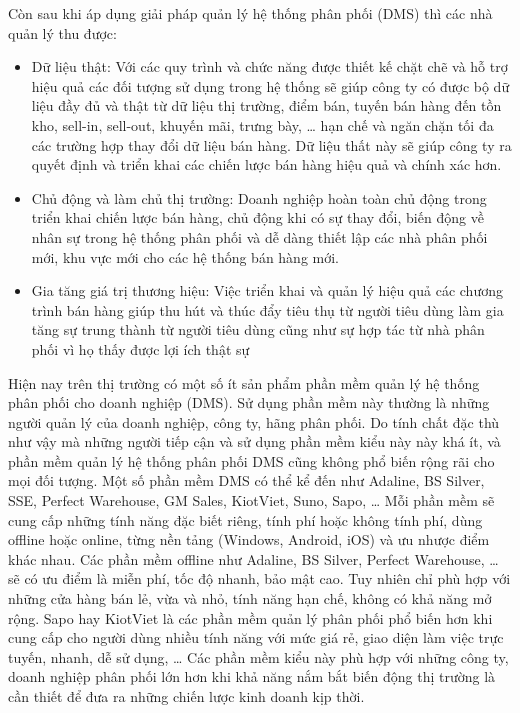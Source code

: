 Còn sau khi áp dụng giải pháp quản lý hệ thống phân phối
(DMS) thì các nhà quản lý thu được:
\begin{itemize}[topsep=0ex]
\item Dữ liệu thật: Với các quy trình và chức năng được thiết kế chặt
    chẽ và hỗ trợ hiệu quả các đối tượng sử dụng trong hệ thống sẽ
    giúp công ty có được bộ dữ liệu đầy đủ và thật từ dữ liệu
    thị trường, điểm bán, tuyến bán hàng đến tồn kho, sell-in, sell-out,
    khuyến mãi, trưng bày, … hạn chế và ngăn chặn tối đa các trường hợp
    thay đổi dữ liệu bán hàng. Dữ liệu thất này sẽ giúp công ty ra
    quyết định và triển khai các chiến lược bán hàng hiệu quả
    và chính xác hơn.

\item Chủ động và làm chủ thị trường: Doanh nghiệp hoàn toàn chủ động
    trong triển khai chiến lược bán hàng, chủ động khi có sự thay đổi,
    biến động về nhân sự trong hệ thống phân phối và dễ dàng thiết
    lập các nhà phân phối mới, khu vực mới cho các hệ thống bán hàng mới.

\item Gia tăng giá trị thương hiệu: Việc triển khai và quản lý hiệu
    quả các chương trình bán hàng giúp thu hút và thúc đẩy tiêu thụ
    từ người tiêu dùng làm gia tăng sự trung thành từ người tiêu
    dùng cũng như sự hợp tác từ nhà phân phối vì
    họ thấy được lợi ích thật sự
\end{itemize}

Hiện nay trên thị trường có một số ít sản phẩm phần mềm quản lý hệ
thống phân phối cho doanh nghiệp (DMS). Sử dụng phần mềm này thường
là những người quản lý của doanh nghiệp, công ty, hãng phân phối.
Do tính chất đặc thù như vậy mà những người tiếp cận và sử dụng phần
mềm kiểu này này khá ít, và phần mềm quản lý hệ thống phân phối DMS
cũng không phổ biến rộng rãi cho mọi đối tượng. Một số phần mềm DMS
có thể kể đến như Adaline, BS Silver, SSE, Perfect Warehouse, GM Sales,
KiotViet, Suno, Sapo, … Mỗi phần mềm sẽ cung cấp những tính năng đặc
biết riêng, tính phí hoặc không tính phí, dùng offline hoặc online, từng
nền tảng (Windows, Android, iOS) và ưu nhược điểm khác nhau. Các phần
mềm offline như Adaline, BS Silver, Perfect Warehouse, … sẽ có ưu điểm
là miễn phí, tốc độ nhanh, bảo mật cao. Tuy nhiên chỉ phù hợp với những
cửa hàng bán lẻ, vừa và nhỏ, tính năng hạn chế, không có khả năng mở
rộng. Sapo hay KiotViet là các phần mềm quản lý phân phối phổ biến
hơn khi cung cấp cho người dùng nhiều tính năng với mức giá rẻ, giao
diện làm việc trực tuyến, nhanh, dễ sử dụng, … Các phần mềm kiểu này
phù hợp với những công ty, doanh nghiệp phân phối lớn hơn khi khả năng
nắm bắt biến động thị trường là cần thiết để đưa ra những
chiến lược kinh doanh kịp thời.

